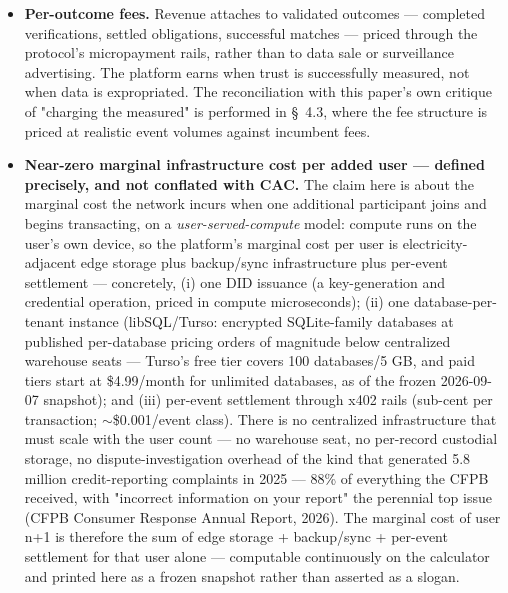 \documentclass[11pt,twocolumn]{article}
\begin{document}
\begin{itemize}
\item \textbf{Per-outcome fees.} Revenue attaches to validated outcomes --- completed verifications, settled obligations, successful matches --- priced through the protocol's micropayment rails, rather than to data sale or surveillance advertising. The platform earns when trust is successfully measured, not when data is expropriated. The reconciliation with this paper's own critique of "charging the measured" is performed in \S~4.3, where the fee structure is priced at realistic event volumes against incumbent fees.
\item \textbf{Near-zero marginal infrastructure cost per added user --- defined precisely, and not conflated with CAC.} The claim here is about the marginal cost the network incurs when one additional participant joins and begins transacting, on a \emph{user-served-compute} model: compute runs on the user's own device, so the platform's marginal cost per user is electricity-adjacent edge storage plus backup/sync infrastructure plus per-event settlement --- concretely, (i) one DID issuance (a key-generation and credential operation, priced in compute microseconds); (ii) one database-per-tenant instance (libSQL/Turso: encrypted SQLite-family databases at published per-database pricing orders of magnitude below centralized warehouse seats --- Turso's free tier covers 100 databases/5 GB, and paid tiers start at \$4.99/month for unlimited databases, as of the frozen 2026-09-07 snapshot); and (iii) per-event settlement through x402 rails (sub-cent per transaction; $\sim$\$0.001/event class). There is no centralized infrastructure that must scale with the user count --- no warehouse seat, no per-record custodial storage, no dispute-investigation overhead of the kind that generated 5.8 million credit-reporting complaints in 2025 --- 88\% of everything the CFPB received, with "incorrect information on your report" the perennial top issue (CFPB Consumer Response Annual Report, 2026). The marginal cost of user n+1 is therefore the sum of edge storage + backup/sync + per-event settlement for that user alone --- computable continuously on the calculator and printed here as a frozen snapshot rather than asserted as a slogan.

\end{itemize}
\end{document}
